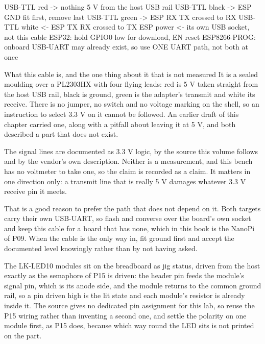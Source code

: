 \begin{asciiart}
USB-TTL red    -> nothing        5 V from the host USB rail
USB-TTL black  -> ESP GND        fit first, remove last
USB-TTL green  -> ESP RX         TX crossed to RX
USB-TTL white  <- ESP TX         RX crossed to TX
ESP power      <- its own USB socket, not this cable
ESP32: hold GPIO0 low for download, EN reset
ESP8266-PROG: onboard USB-UART may already exist, so use ONE
              UART path, not both at once
\end{asciiart}

\begin{note}{What this cable is, and the one thing about it that is not measured}
It is a sealed moulding over a PL2303HX with four flying leads: red is 5 V taken straight from the host USB rail, black is ground, green is the adapter's transmit and white its receive. There is no jumper, no switch and no voltage marking on the shell, so an instruction to select 3.3 V on it cannot be followed. An earlier draft of this chapter carried one, along with a pitfall about leaving it at 5 V, and both described a part that does not exist.

The signal lines are documented as 3.3 V logic, by the source this volume follows and by the vendor's own description. Neither is a measurement, and this bench has no voltmeter to take one, so the claim is recorded as a claim. It matters in one direction only: a transmit line that is really 5 V damages whatever 3.3 V receive pin it meets.

That is a good reason to prefer the path that does not depend on it. Both targets carry their own USB-UART, so flash and converse over the board's own socket and keep this cable for a board that has none, which in this book is the NanoPi of P09. When the cable is the only way in, fit ground first and accept the documented level knowingly rather than by not having asked.
\end{note}

The LK-LED10 modules sit on the breadboard as jig status, driven from the host exactly as the semaphore of P15 is driven: the header pin feeds the module's signal pin, which is its anode side, and the module returns to the common ground rail, so a pin driven high is the lit state and each module's resistor is already inside it. The source gives no dedicated pin assignment for this lab, so reuse the P15 wiring rather than inventing a second one, and settle the polarity on one module first, as P15 does, because which way round the LED sits is not printed on the part.

